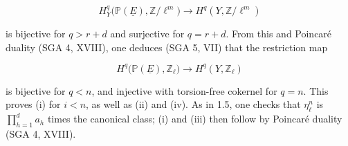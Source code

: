 \begin{equation*}
H_Y^q\bigl(\mathbb P(\underline E),\mathbb Z/\ell^m\bigr)
\longrightarrow H^q(Y,\mathbb Z/\ell^m)
\end{equation*}


is bijective for $q>r+d$ and surjective for $q=r+d$.  From this and
Poincaré duality (SGA 4, XVIII), one deduces (SGA 5, VII) that the
restriction map

\begin{equation*}
H^q\bigl(\mathbb P(\underline E),\mathbb Z_\ell\bigr)
\longrightarrow H^q(Y,\mathbb Z_\ell)
\end{equation*}

is bijective for $q<n$, and injective with torsion-free cokernel for $q=n$.
This proves (i) for $i<n$, as well as (ii) and (iv).  As in 1.5, one checks
that $\eta_\ell^n$ is $\prod_{h=1}^d a_h$ times the canonical class; (i)
and (iii) then follow by Poincaré duality (SGA 4, XVIII).

